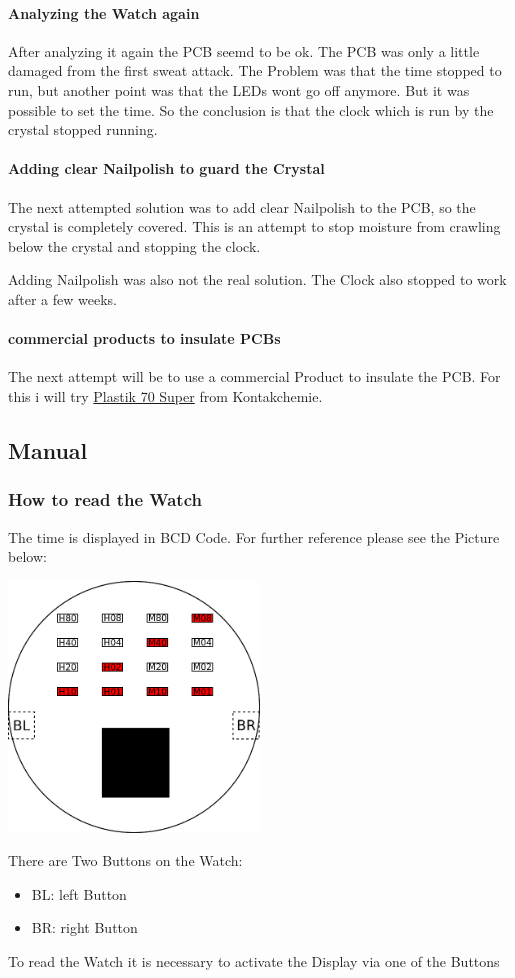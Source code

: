 \paragraph{Analyzing the Watch again}
After analyzing it again the PCB seemd to be ok. The PCB was only a little damaged from the first sweat attack.
The Problem was that the time stopped to run, but another point was that the LEDs wont go off anymore. 
But it was possible to set the time. 
So the conclusion is that the clock which is run by the crystal stopped running.
\paragraph{Adding clear Nailpolish to guard the Crystal}
The next attempted solution was to add clear Nailpolish to the PCB, so the crystal is completely covered. This is an attempt to stop moisture from crawling below the crystal and stopping the clock.

Adding Nailpolish was also not the real solution. The Clock also stopped to work after a few weeks.

\paragraph{commercial products to insulate PCBs}
The next attempt will be to use a commercial Product to insulate the PCB.
For this i will try \href{https://www.reichelt.de/korrosionsschutzlack-plastik-70-super-400-ml-isolierlack-kontakt-32046-p125737.html}{Plastik 70 Super} from Kontakchemie.
\subsection{Manual}
\subsubsection{How to read the Watch}
The time is displayed in BCD Code. For further reference please see the Picture below:
\begin{center}
  \includegraphics[width=0.5\textwidth]{drawings/BinDia1359.png}
\label{fig:BinWatchFace}
\end{center}
There are Two Buttons on the Watch:
\begin{itemize}
	\item BL: left Button
	\item BR: right Button
\end{itemize}
To read the Watch it is necessary to activate the Display via one of the Buttons

